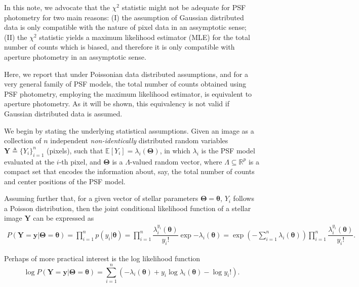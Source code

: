 \documentclass{rnaastex}
\begin{document}
In this note, we advocate that the $\chi^2$ statistic might not be adequate
for PSF photometry for two main reasons: (I) the assumption of Gaussian
distributed data is only compatible with the nature of pixel data in an
assymptotic sense; (II) the $\chi^2$ statistic yields a maximum likelihood
estimator (MLE) for the total number of counts which is biased, and therefore
it is only compatible with aperture photometry in an assymptotic sense.

Here, we report that under Poissonian data distributed assumptions,
and for a very general family of PSF models, the total number of counts
obtained using PSF photometry, employing the maximum likelihood estimator, is
equivalent to aperture photometry. As it will be shown, this equivalency is not
valid if Gaussian distributed data is assumed.

We begin by stating the underlying statistical assumptions.
Given an image as a collection of $n$ independent \emph{non-identically}
distributed random variables $\bm{Y} \triangleq \{Y_i\}_{i=1}^{n}$ (pixels),
such that $\mathbb{E}\left[Y_i\right] = \lambda_i(\bm{\Theta})$, in which
$\lambda_i$ is the PSF model evaluated at the $i$-th pixel, and $\bm{\Theta}$
is a $\Lambda$-valued random vector, where $\Lambda \subseteq \mathbb{R}^p$ is
a compact set that encodes the information about, say, the total number of
counts and center positions of the PSF model.

Assuming further that, for a given vector of stellar parameters
$\bm{\Theta} = \bm{\theta}$, $Y_i$ follows a Poisson distribution, then the
joint conditional likelihood function of a stellar image $\bm{Y}$ can be
expressed as~\citep{grimmett:2001}
\begin{align}
    P(\bm{Y} = \bm{y} | \bm{\Theta} = \bm{\theta}) =
    \prod_{i=1}^{n} p(y_i | \bm{\theta}) =
    \prod_{i=1}^{n}\dfrac{\lambda_i^{y_i}(\bm{\theta})}{y_i!}\exp{-\lambda_i(\bm{\theta})} =
    \exp\left({-\sum_{i=1}^{n}\lambda_i(\bm{\theta})}\right)\prod_{i=1}^{n}\dfrac{\lambda_i^{y_i}(\bm{\theta})}{y_i!}.
\end{align}

Perhaps of more practical interest is the log likelihood function
\begin{equation}
    \log P(\bm{Y} = \bm{y} | \bm{\Theta} = \bm{\theta}) =
    \sum_{i=1}^{n}\left(- \lambda_i(\bm{\theta})
    + y_i\log\lambda_i(\bm{\theta}) - \log y_i !\right).
\end{equation}
\end{document}
